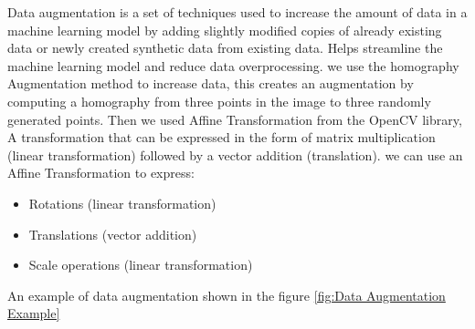 Data augmentation is a set of techniques used to increase the amount of data in a machine learning model by adding slightly modified copies of already existing data or newly created synthetic data from existing data. Helps streamline the machine learning model and reduce data overprocessing.
we use the homography Augmentation method to increase data, this creates an augmentation by computing a homography from three points in the image to three randomly generated points.
Then we used Affine Transformation from the OpenCV library, A transformation that can be expressed in the form of matrix multiplication (linear transformation) followed by a vector addition (translation).
we can use an Affine Transformation to express:
\begin{itemize}
  \item Rotations (linear transformation)
  \item Translations (vector addition)
  \item Scale operations (linear transformation)
\end{itemize}

\noindent
An example of data augmentation shown in the figure \ref{fig:Data Augmentation Example}

